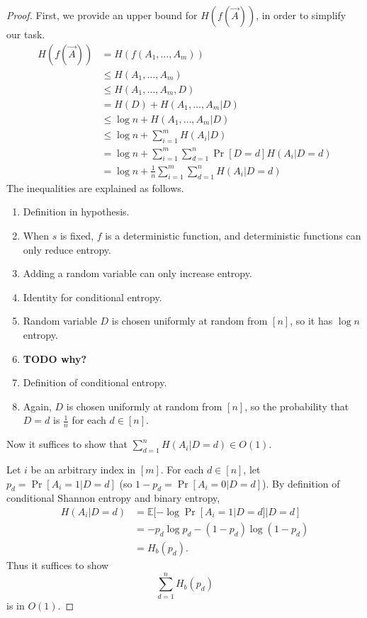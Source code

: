 \documentclass{article}
\newcommand{\todo}[1]{\textbf{TODO #1}}
\begin{document}
\begin{proof}
  First, we provide an upper bound for $H(f(\vec{A}))$, in order to simplify our task.
  \begin{align}
    H(f(\vec{A})) & = H(f(A_1, \dotsc, A_m)) \\
    & \leq H(A_1, \dotsc, A_m) \\
    & \leq H(A_1, \dotsc, A_m, D) \\
    & = H(D) + H(A_1, \dotsc, A_m | D) \\
    & \leq \log n + H(A_1, \dotsc, A_m | D) \\
    & \leq \log n + \sum_{i = 1}^m H(A_i | D) \\
    & = \log n + \sum_{i = 1}^m \sum_{d = 1}^n \Pr[D = d] H(A_i | D = d) \\
    & = \log n + \frac{1}{n} \sum_{i = 1}^m \sum_{d = 1}^n H(A_i | D = d)
  \end{align}
  The inequalities are explained as follows.
  \begin{enumerate}
  \item Definition in hypothesis.
  \item When $s$ is fixed, $f$ is a deterministic function, and deterministic functions can only reduce entropy.
  \item Adding a random variable can only increase entropy.
  \item Identity for conditional entropy.
  \item Random variable $D$ is chosen uniformly at random from $[n]$, so it has $\log n$ entropy.
  \item \todo{why?}
  \item Definition of conditional entropy.
  \item Again, $D$ is chosen uniformly at random from $[n]$, so the probability that $D = d$ is $\frac{1}{n}$ for each $d \in [n]$.
  \end{enumerate}
  Now it suffices to show that $\sum_{d = 1}^n H(A_i | D = d) \in O(1)$.

  Let $i$ be an arbitrary index in $[m]$.
  For each $d \in [n]$, let $p_d = \Pr[A_i = 1 | D = d]$ (so $1 - p_d = \Pr[A_i = 0 | D = d]$).
  By definition of conditional Shannon entropy and binary entropy,
  \begin{align*}
    H(A_i | D = d) & = \mathbb{E}[-\log \Pr[A_i = 1 | D = d] | D = d] \\
    & = -p_d \log p_d - (1 - p_d) \log (1 - p_d) \\
    & = H_b(p_d).
  \end{align*}
  Thus it suffices to show
  \begin{equation}\label{eq:hb}
    \sum_{d = 1}^n H_b(p_d)
  \end{equation}
  is in $O(1)$.


\end{proof}
\end{document}
